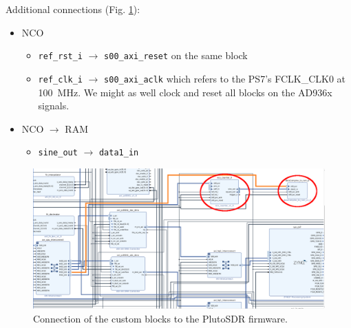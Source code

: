 \documentclass{article}
\begin{document}

Additional connections (Fig. \ref{con}):

\begin{itemize}
\item NCO
	\begin{itemize}
	\item {\tt ref\_rst\_i} $\to$ {\tt s00\_axi\_reset} on the same block
	\item {\tt ref\_clk\_i} $\to$ {\tt s00\_axi\_aclk} which refers to the PS7's
FCLK\_CLK0 at 100~MHz. We might as well clock and reset all blocks on the AD936x signals.
	\end{itemize}
\item NCO $\to$ RAM
        \begin{itemize}
	\item {\tt sine\_out} $\to$ {\tt data1\_in} %
        \end{itemize}
\end{itemize}

\begin{figure}[h!tb]
\begin{center}
\includegraphics[width=\linewidth]{1.png}
\end{center}
\caption{Connection of the custom blocks to the PlutoSDR firmware.}
\label{con}
\end{figure}
\end{document}
